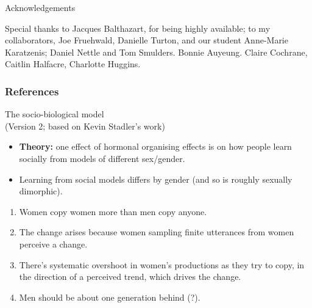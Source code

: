 \documentclass[hyperref={pdfpagelabels=false}]{beamer}
\begin{document}
\begin{frame}{Acknowledgements}
\begin{center}

Special thanks to Jacques Balthazart, for being highly available; to my collaborators, Joe Fruehwald, Danielle Turton, and our student Anne-Marie Karatzenis; Daniel Nettle and Tom Smulders. Bonnie Auyeung. Claire Cochrane, Caitlin Halfacre, Charlotte Huggins.

\end{center}
\end{frame}



\begin{frame}[allowframebreaks]
\frametitle{References}
\newcommand*{\newblock}{natbib}


\end{frame}

\begin{frame}{The socio-biological model \\\small{(Version 2; based on Kevin Stadler's work)}}
	\begin{itemize}
	\item \textbf{Theory:} one effect of hormonal organising effects is on how people learn socially from models of different sex/gender.
	\item Learning from social models differs by gender (and so is roughly sexually dimorphic).
	\end{itemize}
	\begin{enumerate}
	\item Women copy women more than men copy anyone.
	\item The change arises because women sampling finite utterances from women perceive a change.
	\item There's systematic overshoot in women's productions as they try to copy, in the direction of a perceived trend, which drives the change.
	\item Men should be about one generation behind (?).
	\end{enumerate}

\end{frame}
\end{document}
